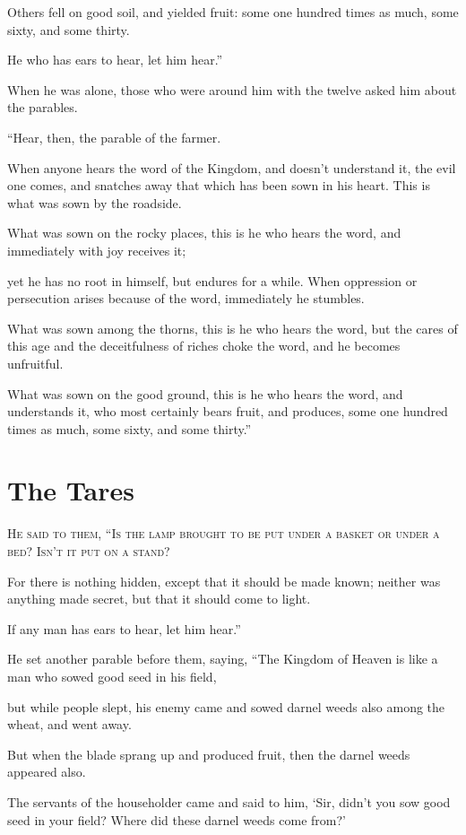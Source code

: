 Others fell on good soil, and yielded fruit: some one hundred times as much, some sixty, and some thirty.

He who has ears to hear, let him hear.”

When he was alone, those who were around him with the twelve asked him about the parables.

“Hear, then, the parable of the farmer.

When anyone hears the word of the Kingdom, and doesn’t understand it, the evil one comes, and snatches away that which has been sown in his heart. This is what was sown by the roadside.

What was sown on the rocky places, this is he who hears the word, and immediately with joy receives it;

yet he has no root in himself, but endures for a while. When oppression or persecution arises because of the word, immediately he stumbles.

What was sown among the thorns, this is he who hears the word, but the cares of this age and the deceitfulness of riches choke the word, and he becomes unfruitful.

What was sown on the good ground, this is he who hears the word, and understands it, who most certainly bears fruit, and produces, some one hundred times as much, some sixty, and some thirty.”

\clearpage \section*{The Tares}
\chapterornament

\lettrine{H}{e said to them, “Is the lamp brought to be put under a basket  or under a bed? Isn’t it put on a stand?}

For there is nothing hidden, except that it should be made known; neither was anything made secret, but that it should come to light.

If any man has ears to hear, let him hear.”

He set another parable before them, saying, “The Kingdom of Heaven is like a man who sowed good seed in his field,

but while people slept, his enemy came and sowed darnel weeds also among the wheat, and went away.

But when the blade sprang up and produced fruit, then the darnel weeds appeared also.

The servants of the householder came and said to him, ‘Sir, didn’t you sow good seed in your field? Where did these darnel weeds come from?’

